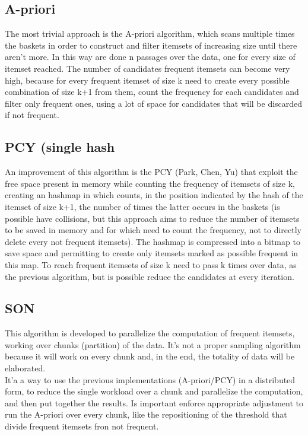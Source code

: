 \documentclass[14pt]{extarticle}
\begin{document}
\subsection{A-priori}
The most trivial approach is the A-priori algorithm, which scans multiple times the baskets in order to construct and filter itemsets of increasing size until there aren't more. In this way are done n passages over the data, one for every size of itemset reached. The number of candidates frequent itemsets can become very high, because for every frequent itemset of size k need to create every possible combination of size k+1 from them, count the frequency for each candidates and filter only frequent ones, using a lot of space for candidates that will be discarded if not frequent.\\
\subsection{PCY (single hash}
An improvement of this algorithm is the PCY (Park, Chen, Yu) that exploit the free space present in memory while counting the frequency of itemsets of size k, creating an hashmap in which counts, in the position indicated by the hash of the itemset of size k+1, the number of times the latter occurs in the baskets (is possible have collisions, but this approach aims to reduce the number of itemsets to be saved in memory and for which need to count the frequency, not to directly delete every not frequent itemsets). The hashmap is compressed into a bitmap to save space and permitting to create only itemsets marked as possible frequent in this map. To reach frequent itemsets of size k need to pass k times over data, as the previous algorithm, but is possible reduce the candidates at every iteration. 
\subsection{SON}
This algorithm is developed to parallelize the computation of frequent itemsets, working over chunks (partition) of the data. It's not a proper sampling algorithm because it will work on every chunk and, in the end, the totality of data will be elaborated.\\
It'a a way to use the previous implementations (A-priori/PCY) in a distributed form, to reduce the single workload over a chunk and parallelize the computation, and then put together the results. Is important enforce appropriate adjustment to run the A-priori over every chunk, like the repositioning of the threshold that divide frequent itemsets fron not frequent.\\
\end{document}
